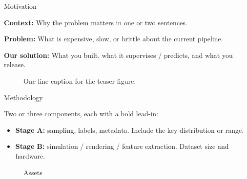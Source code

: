 \documentclass[final]{beamer}
\title{\PosterTitle}
\author{\PosterAuthor}
\institute[shortinst]{\PosterInstitute}
\begin{document}
{
}

\begin{frame}[t]
\begin{columns}[t]
\separatorcolumn

\begin{column}{\colwidth}

  \begin{alertblock}{Motivation}

    \textbf{Context:} Why the problem matters in one or two sentences.

    \textbf{Problem:} What is expensive, slow, or brittle about the current pipeline.

    \textbf{Our solution:} What you built, what it supervises / predicts, and what you release.

  \end{alertblock}

  \begin{figure}
      \centering
      \caption{One-line caption for the teaser figure.}
      \label{fig:teaser}
  \end{figure}

  \begin{block}{Methodology}


  Two or three components, each with a bold lead-in:

  \begin{itemize}
    \item \textbf{Stage A:} sampling, labels, metadata. Include the key distribution or range.
    \item \textbf{Stage B:} simulation / rendering / feature extraction. Dataset size and hardware.
  \end{itemize}

  \begin{figure}
      \centering
      \begin{minipage}[b]{0.32\textwidth}
        \centering
        \caption{Setup}
      \end{minipage}\hfill
      \begin{minipage}[b]{0.32\textwidth}
        \centering
        \caption{Output}
      \end{minipage}\hfill
      \begin{minipage}[b]{0.32\textwidth}
        \centering
        \caption{Assets}
      \end{minipage}
  \end{figure}
  \vspace{-1em}


\end{block}
\end{column}
\end{columns}
\end{frame}
\end{document}
